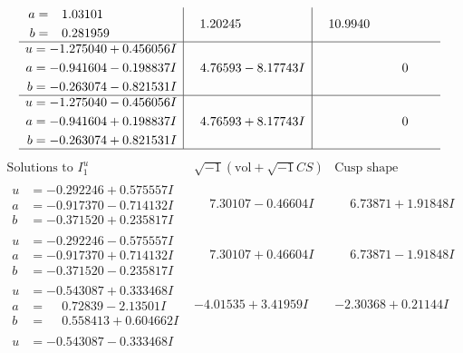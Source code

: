 \documentclass[1p]{elsarticle_modified}
\theoremstyle{definition}
\newcommand{\I}{\sqrt{-1}}
\begin{document}
$$\begin{array}{c|c|c}
\begin{aligned}
a &= \phantom{-}1.03101\phantom{ +0.000000I} \\
b &= \phantom{-}0.281959\phantom{ +0.000000I}\end{aligned}
 & \phantom{-}1.20245\phantom{ +0.000000I} & \phantom{-}10.9940\phantom{ +0.000000I} \\ \hline\begin{aligned}
u &= -1.275040 + 0.456056 I \\
a &= -0.941604 - 0.198837 I \\
b &= -0.263074 - 0.821531 I\end{aligned}
 & \phantom{-}4.76593 - 8.17743 I & \phantom{-0.000000 } 0 \\ \hline\begin{aligned}
u &= -1.275040 - 0.456056 I \\
a &= -0.941604 + 0.198837 I \\
b &= -0.263074 + 0.821531 I\end{aligned}
 & \phantom{-}4.76593 + 8.17743 I & \phantom{-0.000000 } 0\\
 \hline 
 \end{array}$$\newpage$$\begin{array}{c|c|c}  
\text{Solutions to }I^u_{1}& \I (\text{vol} + \sqrt{-1}CS) & \text{Cusp shape}\\
 \hline 
\begin{aligned}
u &= -0.292246 + 0.575557 I \\
a &= -0.917370 - 0.714132 I \\
b &= -0.371520 + 0.235817 I\end{aligned}
 & \phantom{-}7.30107 - 0.46604 I & \phantom{-}6.73871 + 1.91848 I \\ \hline\begin{aligned}
u &= -0.292246 - 0.575557 I \\
a &= -0.917370 + 0.714132 I \\
b &= -0.371520 - 0.235817 I\end{aligned}
 & \phantom{-}7.30107 + 0.46604 I & \phantom{-}6.73871 - 1.91848 I \\ \hline\begin{aligned}
u &= -0.543087 + 0.333468 I \\
a &= \phantom{-}0.72839 - 2.13501 I \\
b &= \phantom{-}0.558413 + 0.604662 I\end{aligned}
 & -4.01535 + 3.41959 I & -2.30368 + 0.21144 I \\ \hline\begin{aligned}
u &= -0.543087 - 0.333468 I \\

\end{aligned}
\end{array}$$
\end{document}
